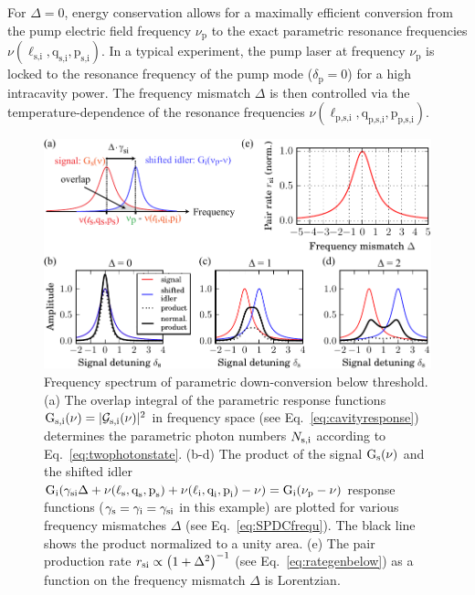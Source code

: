 \documentclass[aps,pra,showpacs,reprint,onecolumn,notitlepage]{revtex4-1}
\newcommand{\tx}[1]{\textnormal{#1}}
\begin{document}
For $\Delta=0$, energy conservation allows for a maximally efficient conversion from the pump electric field frequency $\nu_\textrm{p}$ to the exact parametric resonance frequencies $\nu (\ell_\textrm{s,i},\textrm{q}_\textrm{s,i},\textrm{p}_\textrm{s,i})$. In a typical experiment, the pump laser at frequency $\nu_\textrm{p}$ is locked to the resonance frequency of the pump mode ($\delta_\textrm{p}=0$) for a high intracavity power. The frequency mismatch $\Delta$ is then controlled via the temperature-dependence of the resonance frequencies $\nu (\ell_\textrm{p,s,i},\textrm{q}_\textrm{p,s,i},\textrm{p}_\textrm{p,s,i})$.
\begin{figure}[htb]
	\centering
	\includegraphics[scale=0.8]{pictures/teo_SPDC_spectrum/SPDC_spectrum_1.pdf}
	\caption{Frequency spectrum of parametric down-conversion below threshold. (a) The overlap integral of the parametric response functions $\tx{G}_\tx{s,i}(\nu) = |\mathcal{G}_\tx{s,i}(\nu)|^2$ in frequency space (see Eq.~\ref{eq:cavityresponse}) determines the parametric photon numbers $N_\tx{s,i}$ according to Eq.~\ref{eq:twophotonstate}. (b-d) The product of the signal $\tx{G}_\tx{s}(\nu)$ and the shifted idler $\tx{G}_\tx{i}(\gamma_\tx{si}\Delta + \nu (\ell_\textrm{s},\textrm{q}_\textrm{s},\textrm{p}_\textrm{s} ) +\nu (\ell_\textrm{i},\textrm{q}_\textrm{i},\textrm{p}_\textrm{i} ) -\nu) = \tx{G}_\tx{i}(\nu_\tx{p}-\nu)$ response functions ($\gamma_\tx{s}=\gamma_\tx{i} = \gamma_\tx{si}$ in this example) are plotted for various frequency mismatches $\Delta$ (see Eq.~\ref{eq:SPDCfrequ}). The black line shows the product normalized to a unity area. (e) The pair production rate ${r_\tx{si} \propto \left( 1+\Delta^2 \right)^{-1}}$ (see Eq.~\ref{eq:rategenbelow}) as a function on the frequency mismatch $\Delta$  is Lorentzian.} 
	\label{fig:spdc_spectrum}
\end{figure}
\end{document}
